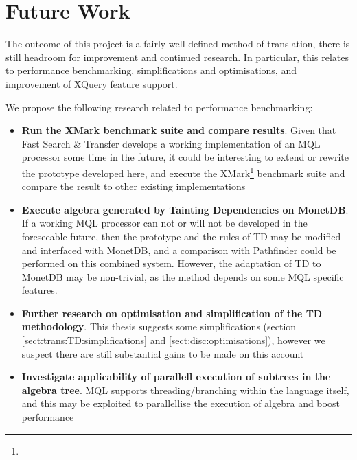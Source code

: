 \chapter{Future Work}
\label{chapter:future}

The outcome of this project is a fairly well-defined method of translation,
there is still headroom for improvement and continued research. In particular,
this relates to performance benchmarking, simplifications and optimisations,
and improvement of XQuery feature support.

We propose the following research related to performance benchmarking:
\begin{itemize}
  \item \textbf{Run the XMark benchmark suite and compare results}. Given that
  Fast Search \& Transfer develops a working implementation of an MQL processor some time in the future, it could be interesting to extend or rewrite the
  prototype developed here, and execute the
  XMark\footnote{} 
  benchmark suite and compare the result to other existing implementations
  \item \textbf{Execute algebra generated by Tainting Dependencies on MonetDB}.
  If a working MQL processor can not or will not be developed in the foreseeable future, then
  the prototype and the rules of TD may be modified
  and interfaced with MonetDB, and a comparison with Pathfinder could be performed on this
  combined system. However, the adaptation of TD to MonetDB
  may be non-trivial, as the method depends on some MQL specific features.
  \item \textbf{Further research on optimisation and simplification of the TD
  methodology}. This thesis suggests some simplifications (section
  \ref{sect:trans:TD:simplifications} and \ref{sect:disc:optimisations}), however we suspect there are still
  substantial gains to be made on this account
  \item \textbf{Investigate applicability of parallell execution of subtrees in the
  algebra tree}. MQL supports threading/branching within the language itself,
  and this may be exploited to parallellise the execution of algebra and boost
  performance
\end{itemize}

